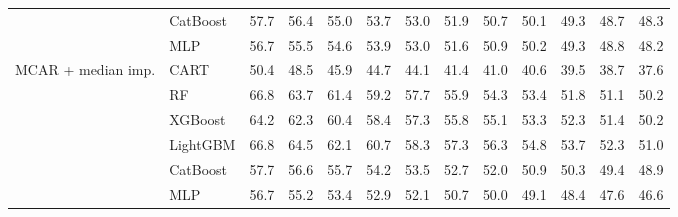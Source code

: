 \begin{table}[p]
\begin{tabular}{@{}llrrrrrrrrrrr@{}}
 & CatBoost & 57.7 & 56.4 & 55.0 & 53.7 & 53.0 & 51.9 & 50.7 & 50.1 & 49.3 & 48.7 & 48.3 \\
 & MLP & 56.7 & 55.5 & 54.6 & 53.9 & 53.0 & 51.6 & 50.9 & 50.2 & 49.3 & 48.8 & 48.2 \\
\midrule
MCAR + median imp. & CART & 50.4 & 48.5 & 45.9 & 44.7 & 44.1 & 41.4 & 41.0 & 40.6 & 39.5 & 38.7 & 37.6 \\
 & RF & 66.8 & 63.7 & 61.4 & 59.2 & 57.7 & 55.9 & 54.3 & 53.4 & 51.8 & 51.1 & 50.2 \\
 & XGBoost & 64.2 & 62.3 & 60.4 & 58.4 & 57.3 & 55.8 & 55.1 & 53.3 & 52.3 & 51.4 & 50.2 \\
 & LightGBM & 66.8 & 64.5 & 62.1 & 60.7 & 58.3 & 57.3 & 56.3 & 54.8 & 53.7 & 52.3 & 51.0 \\
 & CatBoost & 57.7 & 56.6 & 55.7 & 54.2 & 53.5 & 52.7 & 52.0 & 50.9 & 50.3 & 49.4 & 48.9 \\
 & MLP & 56.7 & 55.2 & 53.4 & 52.9 & 52.1 & 50.7 & 50.0 & 49.1 & 48.4 & 47.6 & 46.6 \\
\bottomrule
\end{tabular}
\end{table}

